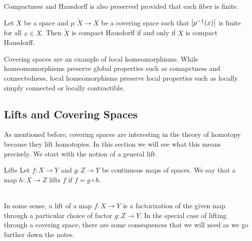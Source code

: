 \documentclass[a4paper]{article}
\begin{document}
Compactness and Hausdorff is also preserved provided that each fiber is finite. 

\begin{prp}{}{} Let $X$ be a space and $p:\tilde{X}\to X$ be a covering space such that $\abs{p^{-1}(x)}$ is finite for all $x\in X$. Then $\tilde{X}$ is compact Hausdorff if and only if $X$ is compact Hausdorff. 
\end{prp}

Covering spaces are an example of local homeomorphisms. While homeomomorphisms preserve global properties such as comapctness and connectedness, local homeomorphisms preserve local properties such as locally simply connected or locally contractible. 

\subsection{Lifts and Covering Spaces}
As mentioned before, covering spaces are interesting in the theory of homotopy because they lift homotopies. In this section we will see what this means precisely. We start with the notion of a general lift. 

\begin{defn}{Lifts}{} Let $f:X\to Y$ and $g:Z\to Y$ be continuous maps of spaces. We say that a map $h:X\to Z$ lifts $f$ if $f=g\circ h$. \\~\\
\end{defn}

In some sense, a lift of a map $f:X\to Y$ is a factorization of the given map through a particular choice of factor $g:Z\to Y$. In the special case of lifting through a covering space, there are some consequences that we will need as we go further down the notes. 
\end{document}

